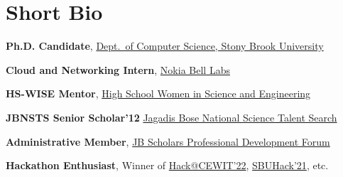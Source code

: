 \documentclass[letterpaper,11pt]{article}
\begin{document}
\begin{minipage}{0.7\textwidth}
\section{Short Bio}
\resumeSubHeadingListStart
\item \textbf{Ph.D. Candidate}, \href{https://www.cs.stonybrook.edu/}{Dept.\ of Computer Science, Stony Brook University}
\item \textbf{Cloud and Networking Intern}, \href{https://www.bell-labs.com/}{Nokia Bell Labs}
\item \textbf{HS-WISE Mentor}, \href{https://www.stonybrook.edu/commcms/wise/pre-college/high_school.php}{High School Women in Science and Engineering}
\item \textbf{JBNSTS Senior Scholar'12} \href{https://jbnsts.ac.in}{Jagadis Bose National Science Talent Search}
\item \textbf{Administrative Member}, \href{https://sites.google.com/view/jbspdf/home}{JB Scholars Professional Development Forum}
\item \textbf{Hackathon Enthusiast}, Winner of \href{https://devpost.com/software/cryptopiens}{Hack@CEWIT'22}, \href{https://devpost.com/software/steganography-attack}{SBUHack'21}, etc.
\resumeSubHeadingListEnd
\end{minipage}
\end{document}
